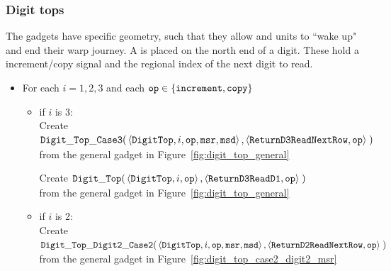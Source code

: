 \subsubsection{Digit tops}
The {\dtop} gadgets have specific geometry, such that they allow {\firstwarp} and
{\secondwarp} units to ``wake up" and end their warp journey. A {\dtop} is placed on
the north end of a digit. These hold a increment/copy signal and the regional index
of the next digit to read.
\vspace{.5cm}

\begin{itemize}

    \item For each $i = 1,2,3$ and each ${\tt op} \in \{ {\tt increment, copy } \}$
    \begin{itemize}

        \item if $i$ is 3: \\
        Create
        $\begin{aligned}[t]
            {\tt Digit\_Top\_Case3}(& \left \langle {\tt DigitTop}, i, {\tt op}, {\tt msr}, {\tt msd} \right\rangle,
                             \left \langle {\tt ReturnD3ReadNextRow}, {\tt op} \right\rangle \;)
        \end{aligned}$ \\ from the general gadget in Figure~\ref{fig:digit_top_general}
        \vspace{.5cm}

        Create
        $\begin{aligned}[t]
            {\tt Digit\_Top}(& \left \langle {\tt DigitTop}, i, {\tt op} \right\rangle,
                    \left \langle {\tt ReturnD3ReadD1}, {\tt op} \right\rangle \;)
        \end{aligned}$ \\ from the general gadget in Figure~\ref{fig:digit_top_general}

        \vspace{.5cm}
        \item if $i$ is 2: \\
        Create
        $\begin{aligned}[t]
            {\tt Digit\_Top\_Digit2\_Case2}(& \left \langle {\tt DigitTop}, i, {\tt op}, {\tt msr}, {\tt msd} \right\rangle,
                               \left \langle {\tt ReturnD2ReadNextRow},  {\tt op} \right\rangle \;)
        \end{aligned}$ \\ from the general gadget in Figure~\ref{fig:digit_top_case2_digit2_msr}
        \vspace{.5cm}


\end{itemize}
\end{itemize}
